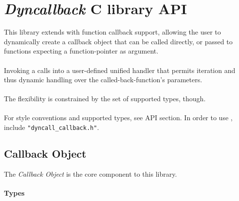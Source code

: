 %
%
%
%

\clearpage
\section{\emph{Dyncallback} C library API}

This library extends  with function callback support, allowing
the user to dynamically create a callback object that can be called directly,
or passed to functions expecting a function-pointer as argument.\\
\\
Invoking a  calls into a user-defined unified handler that 
permits iteration and thus dynamic handling over the called-back-function's
parameters.\\
\\
The flexibility is constrained by the set of supported types, though.\\
\\
For style conventions and supported types, see  API section.
In order to use , include {\tt "dyncall\_callback.h"}.

\subsection{Callback Object}

The \emph{Callback Object} is the core component to this library.

\paragraph{Types}

